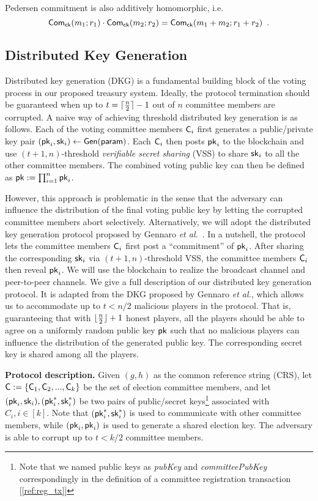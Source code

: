 Pedersen commitment is also additively homomorphic, i.e.
$$
\mathsf{Com}_{\mathsf{ck}}(m_1;r_1)\cdot \mathsf{Com}_{\mathsf{ck}}(m_2;r_2) = \mathsf{Com}_{\mathsf{ck}}(m_1+m_2; r_1+r_2)\enspace.
$$

\subsection{Distributed Key Generation}
Distributed key generation (DKG) is a fundamental building block of the voting process in our proposed treasury system. Ideally, the protocol termination should be guaranteed when up to $t=\lceil \frac{n}{2}\rceil -1$ out of $n$ committee members are corrupted.  A naive way of achieving threshold distributed key generation is as follows. Each of the voting committee members $\mathsf{C}_i$ first generates a public/private key pair $(\mathsf{pk}_i,\mathsf{sk}_i)\leftarrow\mathsf{Gen}(\mathsf{param})$. Each $\mathsf{C}_i$ then posts $\mathsf{pk}_i$ to the blockchain and use $(t+1,n)$-threshold \emph{verifiable secret sharing} (VSS) to share $\mathsf{sk}_i$ to all the other committee members. The combined voting public key can then be defined as $\mathsf{pk}:= \prod_{i=1}^{n} \mathsf{pk}_{i}$.

However, this approach is problematic in the sense that the adversary can influence the distribution of the final voting public key by letting the corrupted committee members abort selectively. Alternatively, we will adopt the distributed key generation protocol proposed by Gennaro {\em et al.}~\cite{GennaroDKG}. 
In a nutshell, the protocol lets the committee members $\mathsf{C}_i$ first post a ``commitment'' of $\mathsf{pk}_i$. After sharing the corresponding $\mathsf{sk}_i$ via $(t+1,n)$-threshold VSS, the committee members $\mathsf{C}_i$ then reveal $\mathsf{pk}_i$.
%
We will use the blockchain to realize the broadcast channel and peer-to-peer channels. We give a full description of our distributed key generation protocol.  It is adapted from the DKG proposed by Gennaro {\em et al.}, which allows us to accommodate up to $t < n/2$ malicious players in the protocol. That is, guaranteeing that with $ \lfloor \frac{n}{2}\rfloor+1$ honest players, all the players should be able to agree on a uniformly random  public key $\mathsf{pk}$ such that no malicious players can influence the distribution of the generated public key. The corresponding secret key is shared among all the players.

\medskip
\noindent\textbf{Protocol description.}
Given $(g,h)$ as the common reference string (CRS), let $\mathsf{C}:=\{\mathsf{C}_1, \mathsf{C}_2,...,\mathsf{C}_k\}$ be the set of election committee members, and let $(\mathsf{pk}_{i},\mathsf{sk}_{i}),(\mathsf{pk}^*_{i},\mathsf{sk}^*_{i})$ be two pairs of public/secret keys\footnote{Note that we named public keys as \textit{pubKey} and \textit{committeePubKey} correspondingly in the definition of a committee registration transaction [\ref{ref:reg_tx}]} associated with $C_i, i \in [k]$. Note that $(\mathsf{pk}^*_{i},\mathsf{sk}^*_{i})$ is used to communicate with other committee members, while $(\mathsf{pk}_{i},\mathsf{pk}_{i})$ is used to generate a shared election key. The adversary is able to corrupt up to $t < k/2 $ committee members.\\

